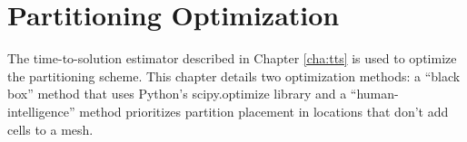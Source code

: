 \section*{Partitioning Optimization}

The time-to-solution estimator described in Chapter \ref{cha:tts} is used to optimize the partitioning scheme.
This  chapter details two optimization methods: a ``black box'' method that uses Python's scipy.optimize library and a ``human-intelligence'' method prioritizes partition placement in locations that don't add cells to a mesh.

